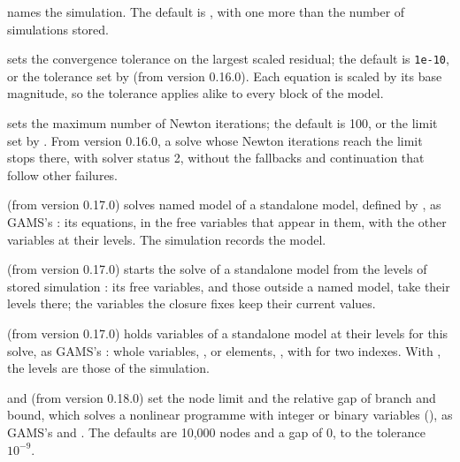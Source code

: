 
\begin{optdesc}
\item[\optarg{}{name}{name}] names the simulation. The default is
\argu{\#}, with \argu{\#} one more than the number of simulations
stored.

\item[\optarg{tol}{erance}{\#}] sets the convergence tolerance on the largest
scaled residual; the default is \texttt{1e-10}, or the tolerance set by
 (from version 0.16.0). Each equation is scaled by its
base magnitude, so the tolerance applies alike to every block of the model.

\item[\optarg{iter}{ate}{\#}] sets the maximum number of Newton iterations; the
default is 100, or the limit set by . From version 0.16.0,
a solve whose Newton iterations reach the limit stops there, with solver
status 2, without the fallbacks and continuation that follow other failures.

\item[\optarg{mod}{el}{name}] (from version 0.17.0) solves named model
 of a standalone model, defined by , as GAMS's
 : its equations, in the free variables that appear in
them, with the other variables at their levels. The simulation records the
model.

\item[\optarg{}{from}{sim}] (from version 0.17.0) starts the solve of a
standalone model from the levels of stored simulation : its free
variables, and those outside a named model, take their levels there; the
variables the closure fixes keep their current values.

\item[\optarg{}{hold}{varlist}] (from version 0.17.0) holds variables of a
standalone model at their levels for this solve, as GAMS's :
whole variables, , or elements, , with
 for two indexes. With , the levels are those of
the simulation.

\item[\optarg{nod}{es}{\#}] and  (from version 0.18.0)
set the node limit and the relative gap of branch and bound, which solves a
nonlinear programme with integer or binary variables (), as
GAMS's  and . The defaults are 10,000 nodes and a gap
of 0, to the tolerance $10^{-9}$.


\end{optdesc}
